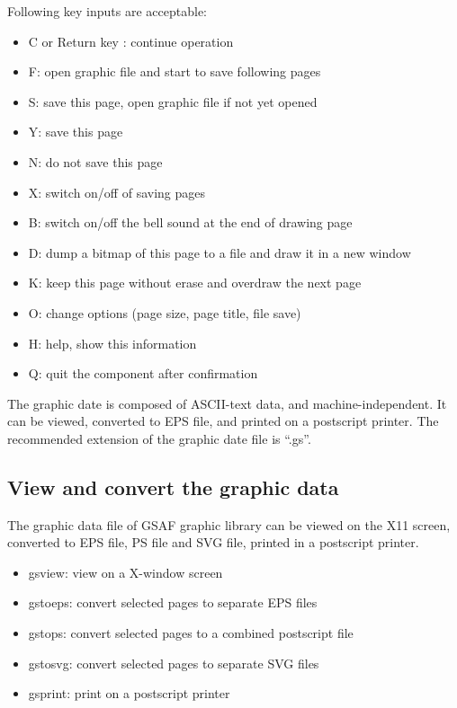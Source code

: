 \documentclass[11pt]{article}
\begin{document}
Following key inputs are acceptable:
\begin{itemize}
\item[] C or Return key : continue operation
\item[] F: open graphic file and start to save following pages
\item[] S: save this page, open graphic file if not yet opened
\item[] Y: save this page
\item[] N: do not save this page
\item[] X: switch on/off of saving pages\item[] B: switch on/off the bell sound at the end of drawing page
\item[] D: dump a bitmap of this page to a file and draw it in a new window
\item[] K: keep this page without erase and overdraw the next page
\item[] O: change options (page size, page title, file save)
\item[] H: help, show this information
\item[] Q: quit the component after confirmation
\end{itemize}

The graphic date is composed of ASCII-text data, and
machine-independent.  It can be viewed, converted to EPS file, and
printed on a postscript printer.  The recommended extension of the
graphic date file is ``.gs''.

\subsection{View and convert the graphic data}

The graphic data file of GSAF graphic library can be viewed on the X11
screen, converted to EPS file, PS file and SVG file, printed in a
postscript printer.

\begin{itemize}
\item[] gsview: view on a X-window screen
\item[] gstoeps: convert selected pages to separate EPS files
\item[] gstops: convert selected pages to a combined postscript file
\item[] gstosvg: convert selected pages to separate SVG files
\item[] gsprint: print on a postscript printer
\end{itemize}
\end{document}
